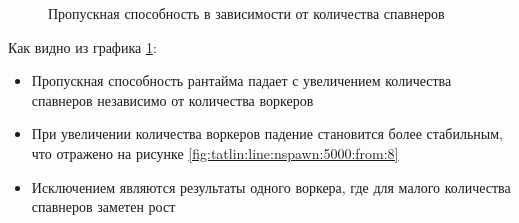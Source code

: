 \begin{figure}[H]
    \begin{center}
    \end{center}

    \caption{Пропускная способность в зависимости от количества спавнеров}
    \label{fig:tatlin:line:nspawn:5000}
\end{figure}

Как видно из графика \ref{fig:tatlin:line:nspawn:5000}:

\begin{itemize}
    \item Пропускная способность рантайма падает с увеличением количества спавнеров независимо от количества воркеров
    \item При увеличении количества воркеров падение становится более стабильным, что отражено на рисунке \ref{fig:tatlin:line:nspawn:5000:from:8}
    \item Исключением являются результаты одного воркера, где для малого количества спавнеров заметен рост
\end{itemize}

